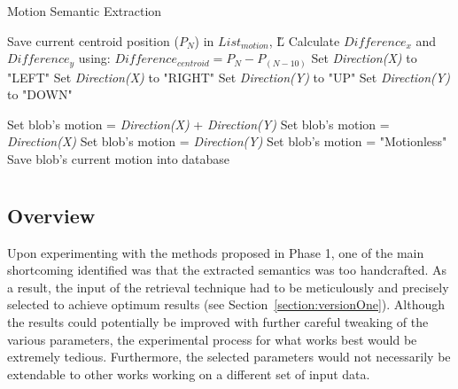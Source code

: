  \begin{algorithm}[H]
    \caption{Motion Semantic Extraction}
    \label{algo:motion}
    \begin{algorithmic}[1]
        \STATE Save current centroid position ($P_N$) in $List_{motion}$, \H{L}
        \STATE Calculate $Difference_x$ and $Difference_y$ using:
        \STATE $Difference_{centroid} = P_N -P_{(N-10)}$
        \STATE Set \textit{Direction(X)} to "LEFT"
        \ELSE
        \STATE Set \textit{Direction(X)} to "RIGHT"
        \ENDIF
        \ENDIF
        \STATE Set \textit{Direction(Y)} to "UP"
        \ELSE
        \STATE Set \textit{Direction(Y)} to "DOWN"
        \ENDIF
        \ENDIF

        \STATE Set blob's motion = \textit{Direction(X)} + \textit{Direction(Y)}
        \ELSE
        \STATE Set blob's motion = \textit{Direction(X) }
        \STATE Set blob's motion = \textit{Direction(Y)}
        \ELSE
        \STATE Set blob's motion = "Motionless"
        \ENDIF
        \ENDIF
        \ENDIF
        \STATE Save blob's current motion into database
        \ENDFOR
    \end{algorithmic}
\end{algorithm}



\section{\versionTwoExt }
\label{section:semantic_chamfer}

\subsection{Overview}

Upon experimenting with the methods proposed in Phase 1, one of the main shortcoming identified was that the extracted semantics was too handcrafted.
As a result, the input of the retrieval technique had to be meticulously and precisely selected to achieve optimum results (see Section~\ref{section:versionOne}).
Although the results could potentially be improved with further careful tweaking of the various parameters, the experimental process for what works best would be extremely tedious.
Furthermore, the selected parameters would not necessarily be extendable to other works working on a different set of input data.

